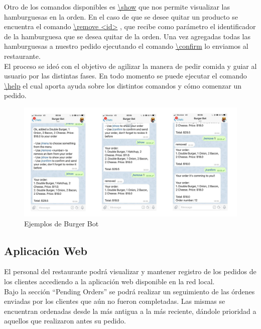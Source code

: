 \documentclass[a4paper,12pt]{article}
\begin{document}
Otro de los comandos disponibles es \color{blue}\uline{\textbackslash show} \color{black} que nos permite visualizar las hamburguesas en la orden. En el caso de que se desee quitar un producto se encuentra el comando
\color{blue}\uline{\textbackslash remove <id>}\color{black}
, que recibe como parámetro el identificador de la hamburguesa que se desea quitar de la orden. Una vez agregadas todas las hamburguesas a nuestro pedido ejecutando el comando 
\color{blue}\uline{\textbackslash confirm} \color{black} 
lo enviamos al restaurante.
\\
El proceso se ideó con el objetivo de agilizar la manera de pedir comida y guiar al usuario por las distintas fases. En todo momento se puede ejecutar el comando 
\color{blue}\uline{\textbackslash help} \color{black}
el cual aporta ayuda sobre los distintos comandos y cómo comenzar un pedido.

\begin{figure}[H]
	\centering
	\includegraphics[width=1.0\linewidth]{ejemplos-chat-bot.jpeg}
	\caption{Ejemplos de Burger Bot}
	\label{fig:Armado hamburguesa chat bot}
\end{figure}

\subsection{Aplicación Web}

El personal del restaurante podrá visualizar y mantener registro de los pedidos de los clientes accediendo a la aplicación web disponible en la red local.
\\
Bajo la sección “Pending Orders” se podrá realizar un seguimiento de las órdenes enviadas por los clientes que aún no fueron completadas. Las mismas se encuentran ordenadas desde la más antigua a la más reciente, dándole prioridad a aquellos que realizaron antes su pedido.
\end{document}

